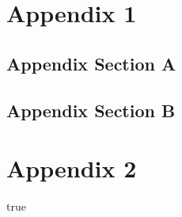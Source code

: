 \documentclass[11pt,a4paper,english,notitlepage]{report}
\newcommand{\istrue}{true}
\begin{document}

\pagestyle{fancy}





\newpage

{}
\appendix
\appendixpage

\chapter{Appendix 1}
\label{chap:appendix_1}

\section{Appendix Section A}
\label{sec:appendix_1}

\section{Appendix Section B}
\label{sec:appendix_2}

\chapter{Appendix 2}
\label{chap:appendix_2}

\clearpage


{}
\printbibliography[title={Bibliography}]

\clearpage


\ifx {}\istrue

\newcommand{\BPOone}{BPO2021}
\newcommand{\BPOtwo}{BPO2024}
\newcommand{\MPO}{MPO2021}

\thispagestyle{empty}
\label{erklaerung}

\setlength{\parindent}{0em}
\end{document}
